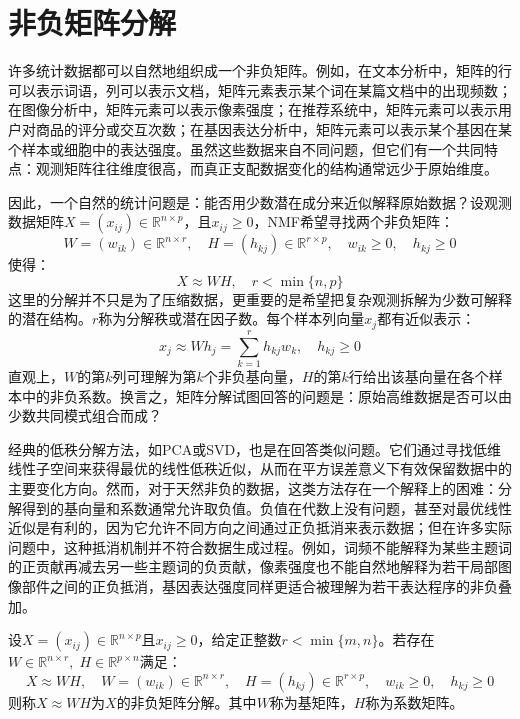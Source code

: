  \section{非负矩阵分解}

许多统计数据都可以自然地组织成一个非负矩阵。例如，在文本分析中，矩阵的行可以表示词语，列可以表示文档，矩阵元素表示某个词在某篇文档中的出现频数；在图像分析中，矩阵元素可以表示像素强度；在推荐系统中，矩阵元素可以表示用户对商品的评分或交互次数；在基因表达分析中，矩阵元素可以表示某个基因在某个样本或细胞中的表达强度。虽然这些数据来自不同问题，但它们有一个共同特点：观测矩阵往往维度很高，而真正支配数据变化的结构通常远少于原始维度。\par
因此，一个自然的统计问题是：能否用少数潜在成分来近似解释原始数据？设观测数据矩阵$X=(x_{ij})\in\mathbb{R}^{n\times p}$，且$x_{ij}\geqslant0$，\gls{NMF}希望寻找两个非负矩阵：
\begin{equation*}
	W=(w_{ik})\in\mathbb{R}^{n\times r},\quad H=(h_{kj})\in\mathbb{R}^{r\times p},\quad w_{ik}\geqslant0,\quad h_{kj}\geqslant0
\end{equation*}
使得：
\begin{equation*}
	X\approx WH,\quad r<\min\{n,p\}
\end{equation*}
这里的分解并不只是为了压缩数据，更重要的是希望把复杂观测拆解为少数可解释的潜在结构。$r$称为分解秩或潜在因子数。每个样本列向量$x_j$都有近似表示：
\begin{equation*}
	x_j\approx Wh_j=\sum_{k=1}^{r}h_{kj}w_k,\quad h_{kj}\geqslant0
\end{equation*}
直观上，$W$的第$k$列可理解为第$k$个非负基向量，$H$的第$k$行给出该基向量在各个样本中的非负系数。换言之，矩阵分解试图回答的问题是：原始高维数据是否可以由少数共同模式组合而成？\par
经典的低秩分解方法，如PCA或SVD，也是在回答类似问题。它们通过寻找低维线性子空间来获得最优的线性低秩近似，从而在平方误差意义下有效保留数据中的主要变化方向。然而，对于天然非负的数据，这类方法存在一个解释上的困难：分解得到的基向量和系数通常允许取负值。负值在代数上没有问题，甚至对最优线性近似是有利的，因为它允许不同方向之间通过正负抵消来表示数据；但在许多实际问题中，这种抵消机制并不符合数据生成过程。例如，词频不能解释为某些主题词的正贡献再减去另一些主题词的负贡献，像素强度也不能自然地解释为若干局部图像部件之间的正负抵消，基因表达强度同样更适合被理解为若干表达程序的非负叠加。\par
\begin{definition}
	设$X=(x_{ij})\in\mathbb{R}^{n\times p}$且$x_{ij}\geqslant0$，给定正整数$r<\min\{m,n\}$。若存在$W\in\mathbb{R}^{n\times r},\;H\in\mathbb{R}^{p\times n}$满足：
	\begin{equation*}
		X\approx WH,\quad W=(w_{ik})\in\mathbb{R}^{n\times r},\quad H=(h_{kj})\in\mathbb{R}^{r\times p},\quad w_{ik}\geqslant0,\quad h_{kj}\geqslant0
	\end{equation*}
	则称$X\approx WH$为$X$的非负矩阵分解。其中$W$称为基矩阵，$H$称为系数矩阵。
\end{definition}
